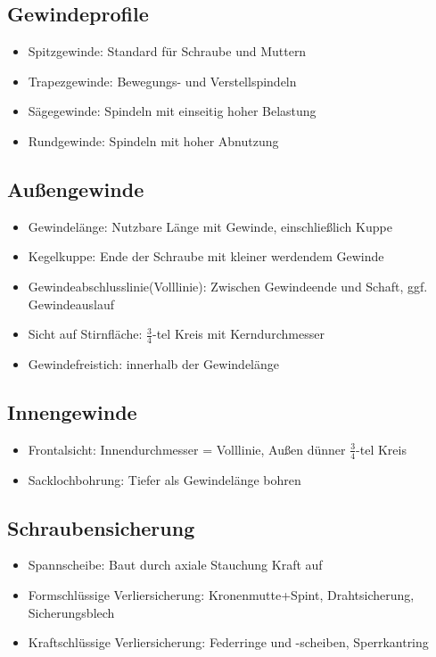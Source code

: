 \documentclass[a4paper,parskip=half*,DIV=7,fontsize=11pt]{scrartcl}
\begin{document}
\subsection{Gewindeprofile}
\begin{itemize}
	\item Spitzgewinde: Standard für Schraube und Muttern
	\item Trapezgewinde: Bewegungs- und Verstellspindeln
	\item Sägegewinde: Spindeln mit einseitig hoher Belastung
	\item Rundgewinde: Spindeln mit hoher Abnutzung
\end{itemize}
	
\subsection{Außengewinde}
\begin{itemize}
	\item Gewindelänge: Nutzbare Länge mit Gewinde, einschließlich Kuppe
	\item Kegelkuppe: Ende der Schraube mit kleiner werdendem Gewinde
	\item Gewindeabschlusslinie(Volllinie): Zwischen Gewindeende und Schaft, ggf. Gewindeauslauf
	\item Sicht auf Stirnfläche: $\frac{3}{4}$-tel Kreis mit Kerndurchmesser
	\item Gewindefreistich: innerhalb der Gewindelänge
\end{itemize}
	
\subsection{Innengewinde}
\begin{itemize}
	\item Frontalsicht: Innendurchmesser = Volllinie, Außen dünner $\frac{3}{4}$-tel Kreis
	\item Sacklochbohrung: Tiefer als Gewindelänge bohren
\end{itemize}
	
\subsection{Schraubensicherung}
\begin{itemize}
	\item Spannscheibe: Baut durch axiale Stauchung Kraft auf
	\item Formschlüssige Verliersicherung: Kronenmutte+Spint, Drahtsicherung, Sicherungsblech
	\item Kraftschlüssige Verliersicherung: Federringe und -scheiben, Sperrkantring
\end{itemize}
	
\end{document}
